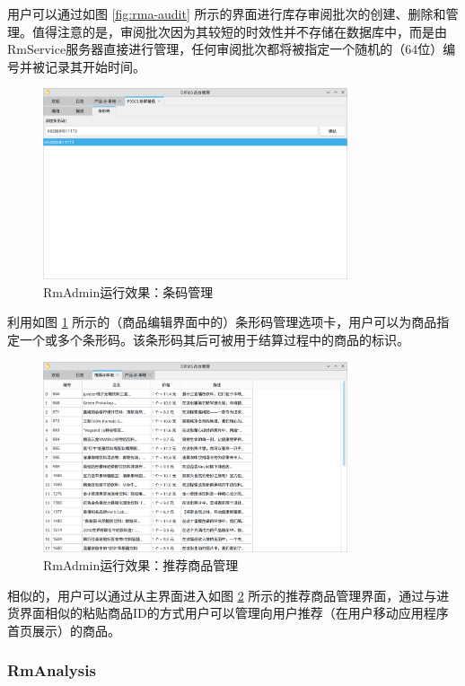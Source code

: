 用户可以通过如图 \ref{fig:rma-audit} 所示的界面进行库存审阅批次的创建、删除和管理。值得注意的是，审阅批次因为其较短的时效性并不存储在数据库中，而是由RmService服务器直接进行管理，任何审阅批次都将被指定一个随机的（64位）编号并被记录其开始时间。

\begin{figure}[htbp]
	\centering
	\includegraphics[width=0.8\textwidth]{./exp/rma-bc.png}
	\caption{RmAdmin运行效果：条码管理}
	\label{fig:rma-bc}
\end{figure}

利用如图 \ref{fig:rma-bc} 所示的（商品编辑界面中的）条形码管理选项卡，用户可以为商品指定一个或多个条形码。该条形码其后可被用于结算过程中的商品的标识。

\begin{figure}[htbp]
	\centering
	\includegraphics[width=0.8\textwidth]{./exp/rma-feat.png}
	\caption{RmAdmin运行效果：推荐商品管理}
	\label{fig:rma-feat}
\end{figure}

相似的，用户可以通过从主界面进入如图 \ref{fig:rma-feat} 所示的推荐商品管理界面，通过与进货界面相似的粘贴商品ID的方式用户可以管理向用户推荐（在用户移动应用程序首页展示）的商品。

\subsubsection{RmAnalysis}

